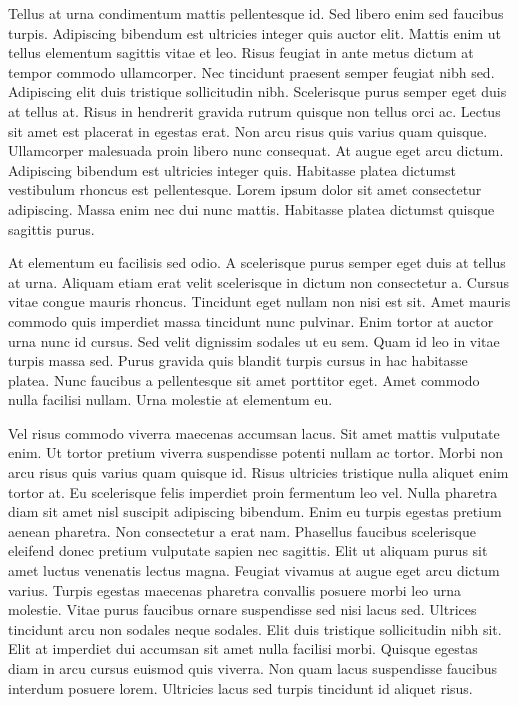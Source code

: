 \documentclass[conference]{IEEEtran}
\begin{document}
Tellus at urna condimentum mattis pellentesque id. Sed libero enim sed faucibus turpis. Adipiscing bibendum est ultricies integer quis auctor elit. Mattis enim ut tellus elementum sagittis vitae et leo. Risus feugiat in ante metus dictum at tempor commodo ullamcorper. Nec tincidunt praesent semper feugiat nibh sed. Adipiscing elit duis tristique sollicitudin nibh. Scelerisque purus semper eget duis at tellus at. Risus in hendrerit gravida rutrum quisque non tellus orci ac. Lectus sit amet est placerat in egestas erat. Non arcu risus quis varius quam quisque. Ullamcorper malesuada proin libero nunc consequat. At augue eget arcu dictum. Adipiscing bibendum est ultricies integer quis. Habitasse platea dictumst vestibulum rhoncus est pellentesque. Lorem ipsum dolor sit amet consectetur adipiscing. Massa enim nec dui nunc mattis. Habitasse platea dictumst quisque sagittis purus.

At elementum eu facilisis sed odio. A scelerisque purus semper eget duis at tellus at urna. Aliquam etiam erat velit scelerisque in dictum non consectetur a. Cursus vitae congue mauris rhoncus. Tincidunt eget nullam non nisi est sit. Amet mauris commodo quis imperdiet massa tincidunt nunc pulvinar. Enim tortor at auctor urna nunc id cursus. Sed velit dignissim sodales ut eu sem. Quam id leo in vitae turpis massa sed. Purus gravida quis blandit turpis cursus in hac habitasse platea. Nunc faucibus a pellentesque sit amet porttitor eget. Amet commodo nulla facilisi nullam. Urna molestie at elementum eu.

Vel risus commodo viverra maecenas accumsan lacus. Sit amet mattis vulputate enim. Ut tortor pretium viverra suspendisse potenti nullam ac tortor. Morbi non arcu risus quis varius quam quisque id. Risus ultricies tristique nulla aliquet enim tortor at. Eu scelerisque felis imperdiet proin fermentum leo vel. Nulla pharetra diam sit amet nisl suscipit adipiscing bibendum. Enim eu turpis egestas pretium aenean pharetra. Non consectetur a erat nam. Phasellus faucibus scelerisque eleifend donec pretium vulputate sapien nec sagittis. Elit ut aliquam purus sit amet luctus venenatis lectus magna. Feugiat vivamus at augue eget arcu dictum varius. Turpis egestas maecenas pharetra convallis posuere morbi leo urna molestie. Vitae purus faucibus ornare suspendisse sed nisi lacus sed. Ultrices tincidunt arcu non sodales neque sodales. Elit duis tristique sollicitudin nibh sit. Elit at imperdiet dui accumsan sit amet nulla facilisi morbi. Quisque egestas diam in arcu cursus euismod quis viverra. Non quam lacus suspendisse faucibus interdum posuere lorem. Ultricies lacus sed turpis tincidunt id aliquet risus.
\end{document}

